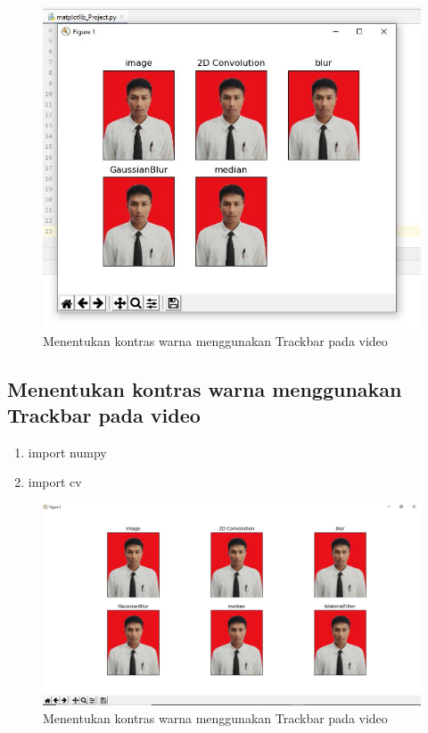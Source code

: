 \newpage
\begin{figure}[ht]
\centering
\includegraphics[scale=0.5]{figures/2,62.jpg}
\caption{Menentukan kontras warna menggunakan Trackbar pada video}
\label{contoh}
\end{figure}







\newpage
\subsection{Menentukan kontras warna menggunakan Trackbar pada video}

\begin{enumerate}
	\item import numpy
	\item import cv
\end{enumerate}

\newpage
\begin{figure}[ht]
\centering
\includegraphics[scale=0.5]{figures/2,63.jpg}
\caption{Menentukan kontras warna menggunakan Trackbar pada video}
\label{contoh}
\end{figure}






